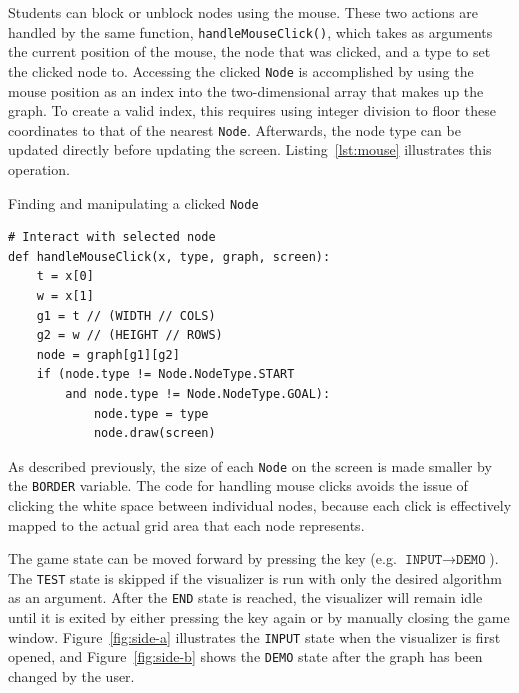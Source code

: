 \documentclass[pageno]{jpaper}
\begin{document}
Students can block or unblock nodes using the mouse. These two actions are handled by the same function, \texttt{handleMouseClick()}, which takes as arguments the current position of the mouse, the node that was clicked, and a type to set the clicked node to. Accessing the clicked \texttt{Node} is accomplished by using the mouse position as an index into the two-dimensional array that makes up the graph. To create a valid index, this requires using integer division to floor these coordinates to that of the nearest \texttt{Node}. Afterwards, the node type can be updated directly before updating the screen. Listing~\ref{lst:mouse} illustrates this operation.

\begin{listing}[hbt]
\centering
\begin{minipage}{0.8\textwidth}%
\linespread{1.0}
\caption{Finding and manipulating a clicked \texttt{Node}}
\begin{verbatim}
# Interact with selected node
def handleMouseClick(x, type, graph, screen):
	t = x[0]
	w = x[1]
	g1 = t // (WIDTH // COLS)
	g2 = w // (HEIGHT // ROWS)
	node = graph[g1][g2]
	if (node.type != Node.NodeType.START 
		and node.type != Node.NodeType.GOAL):
			node.type = type
			node.draw(screen)
\end{verbatim}
\label{lst:mouse}
\end{minipage}
\end{listing}

As described previously, the size of each \texttt{Node} on the screen is made smaller by the \texttt{BORDER} variable. The code for handling mouse clicks avoids the issue of clicking the white space between individual nodes, because each click is effectively mapped to the actual grid area that each node represents.

The game state can be moved forward by pressing the  key (e.g. $\texttt{INPUT} \rightarrow \texttt{DEMO}$). The \texttt{TEST} state is skipped if the visualizer is run with only the desired algorithm as an argument. After the \texttt{END} state is reached, the visualizer will remain idle until it is exited by either pressing the  key again or by manually closing the game window. Figure~\ref{fig:side-a} illustrates the \texttt{INPUT} state when the visualizer is first opened, and Figure~\ref{fig:side-b} shows the \texttt{DEMO} state after the graph has been changed by the user.
\end{document}
